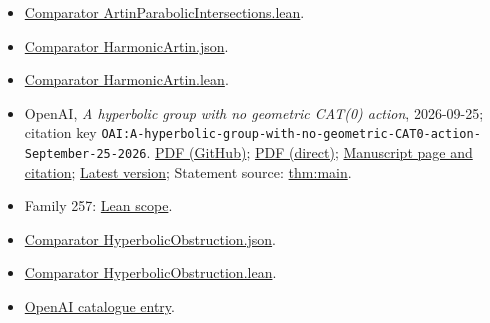 \documentclass[11pt]{article}
\begin{document}
\begin{itemize}
\item \href{https://github.com/openai/math/blob/adc7f1241b42e322a6451854ab7e4b4c146bf78a/lean/ComparatorChallenges/ArtinParabolicIntersections.lean}{Comparator ArtinParabolicIntersections.lean}.
\item \href{https://github.com/openai/math/blob/adc7f1241b42e322a6451854ab7e4b4c146bf78a/lean/ComparatorChallenges/HarmonicArtin.json}{Comparator HarmonicArtin.json}.
\item \href{https://github.com/openai/math/blob/adc7f1241b42e322a6451854ab7e4b4c146bf78a/lean/ComparatorChallenges/HarmonicArtin.lean}{Comparator HarmonicArtin.lean}.
\item OpenAI, \emph{A hyperbolic group with no geometric CAT(0) action}, 2026-09-25; citation key \texttt{OAI:A-hyperbolic-group-with-no-geometric-CAT0-action-September-25-2026}. \href{https://github.com/openai/math/blob/adc7f1241b42e322a6451854ab7e4b4c146bf78a/preprints/A-hyperbolic-group-with-no-geometric-CAT0-action-September-25-2026/paper.pdf}{PDF (GitHub)}; \href{https://github.com/openai/math/raw/adc7f1241b42e322a6451854ab7e4b4c146bf78a/preprints/A-hyperbolic-group-with-no-geometric-CAT0-action-September-25-2026/paper.pdf}{PDF (direct)}; \href{https://github.com/openai/math/blob/adc7f1241b42e322a6451854ab7e4b4c146bf78a/preprints/A-hyperbolic-group-with-no-geometric-CAT0-action-September-25-2026/README.md}{Manuscript page and citation}; \href{https://github.com/openai/math/blob/main/preprints/A-hyperbolic-group-with-no-geometric-CAT0-action-September-25-2026/paper.pdf}{Latest version}; Statement source: \href{https://github.com/openai/math/blob/adc7f1241b42e322a6451854ab7e4b4c146bf78a/preprints/A-hyperbolic-group-with-no-geometric-CAT0-action-September-25-2026/build/sections/01-introduction.tex\#L6}{thm:main}.
\item Family 257: \href{https://github.com/openai/math/blob/adc7f1241b42e322a6451854ab7e4b4c146bf78a/lean/docs/257.md}{Lean scope}.
\item \href{https://github.com/openai/math/blob/adc7f1241b42e322a6451854ab7e4b4c146bf78a/lean/ComparatorChallenges/HyperbolicObstruction.json}{Comparator HyperbolicObstruction.json}.
\item \href{https://github.com/openai/math/blob/adc7f1241b42e322a6451854ab7e4b4c146bf78a/lean/ComparatorChallenges/HyperbolicObstruction.lean}{Comparator HyperbolicObstruction.lean}.
\item \href{https://github.com/openai/math/blob/adc7f1241b42e322a6451854ab7e4b4c146bf78a/CONTENTS.md}{OpenAI catalogue entry}.
\end{itemize}
\end{document}
